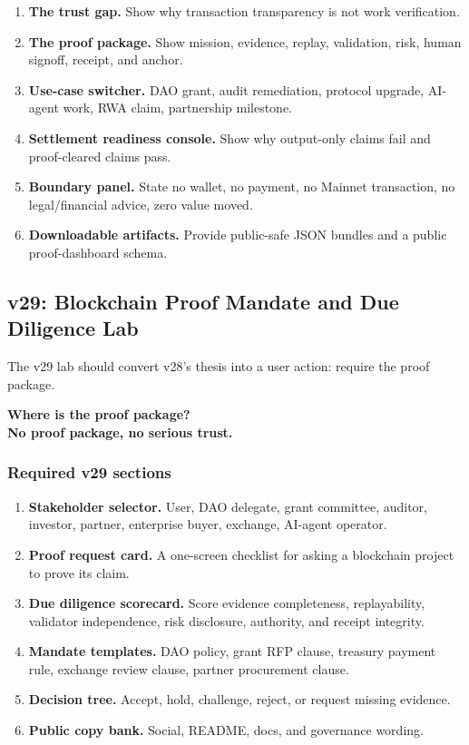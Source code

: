 \documentclass[11pt]{article}
\begin{document}
\begin{enumerate}
  \item \textbf{The trust gap.} Show why transaction transparency is not work verification.
  \item \textbf{The proof package.} Show mission, evidence, replay, validation, risk, human signoff, receipt, and anchor.
  \item \textbf{Use-case switcher.} DAO grant, audit remediation, protocol upgrade, AI-agent work, RWA claim, partnership milestone.
  \item \textbf{Settlement readiness console.} Show why output-only claims fail and proof-cleared claims pass.
  \item \textbf{Boundary panel.} State no wallet, no payment, no Mainnet transaction, no legal/financial advice, zero value moved.
  \item \textbf{Downloadable artifacts.} Provide public-safe JSON bundles and a public proof-dashboard schema.
\end{enumerate}

\subsection{v29: Blockchain Proof Mandate and Due Diligence Lab}

The v29 lab should convert v28's thesis into a user action: require the proof package.

\begin{center}
{\Large\bfseries Where is the proof package?}\\[2pt]
{\large\bfseries No proof package, no serious trust.}
\end{center}

\subsubsection*{Required v29 sections}

\begin{enumerate}
  \item \textbf{Stakeholder selector.} User, DAO delegate, grant committee, auditor, investor, partner, enterprise buyer, exchange, AI-agent operator.
  \item \textbf{Proof request card.} A one-screen checklist for asking a blockchain project to prove its claim.
  \item \textbf{Due diligence scorecard.} Score evidence completeness, replayability, validator independence, risk disclosure, authority, and receipt integrity.
  \item \textbf{Mandate templates.} DAO policy, grant RFP clause, treasury payment rule, exchange review clause, partner procurement clause.
  \item \textbf{Decision tree.} Accept, hold, challenge, reject, or request missing evidence.
  \item \textbf{Public copy bank.} Social, README, docs, and governance wording.
\end{enumerate}
\end{document}
